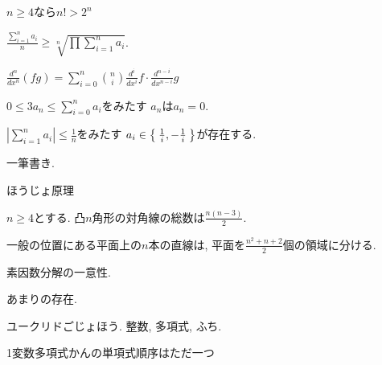 \begin{prop}
  $n\geq 4$なら$n!>2^n$
\end{prop}



\begin{prop}
  $\frac{\sum_{i=1}^n a_i}{n} \geq \sqrt[n]{\prod\sum_{i=1}^n a_i}$.
\end{prop}


\begin{prop}
$\frac{d^n}{dx^n}(fg)=\sum_{i=0}^n\binom{n}{i}\frac{d^i}{dx^i}f \cdot \frac{d^{n-i}}{dx^{n-i}}g$
\end{prop}




\begin{prop}
  $0\leq 3a_n\leq\sum_{i=0}^n a_i$をみたす
  $a_n$は$a_n=0$.
\end{prop}

\begin{prop}
  $|\sum_{i=1}^{n}a_i|\leq \frac{1}{n}$をみたす
  $a_i\in\Set{\frac{1}{i},-\frac{1}{i}}$が存在する.
\end{prop}

\begin{prop}
一筆書き.
\end{prop}

\begin{prop}
ほうじょ原理
\end{prop}

\begin{prop}
  $n\geq 4$とする.
  凸$n$角形の対角線の総数は$\frac{n(n-3)}{2}$.
\end{prop}

\begin{prop}
  一般の位置にある平面上の$n$本の直線は,
  平面を$\frac{n^2+n+2}{2}$個の領域に分ける.
\end{prop}

\begin{prop}
  素因数分解の一意性.
\end{prop}

\begin{prop}
  あまりの存在.
\end{prop}

\begin{prop}
  ユークリドごじょほう.  整数, 多項式, ふち.
\end{prop}

\begin{prop}
  1変数多項式かんの単項式順序はただ一つ
\end{prop}

